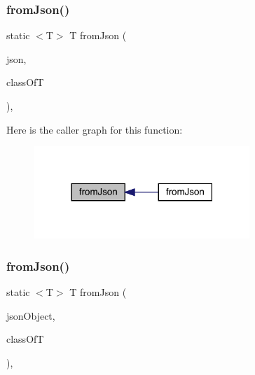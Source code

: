 \subsubsection{\texorpdfstring{from\+Json()}{fromJson()}\hspace{0.1cm}{\footnotesize\ttfamily [1/3]}}
{\footnotesize\ttfamily static $<$T$>$ T from\+Json (\begin{DoxyParamCaption}\item[{@Non\+Null String}]{json,  }\item[{Class$<$ T $>$}]{class\+OfT }\end{DoxyParamCaption})\hspace{0.3cm}{\ttfamily [static]}, {\ttfamily [inherited]}}

Here is the caller graph for this function\+:
\nopagebreak
\begin{figure}[H]
\begin{center}
\leavevmode
\includegraphics[width=230pt]{classcom_1_1toast_1_1android_1_1gamebase_1_1base_1_1_value_object_ae6655c88c20a9a8406dc11b46250ac7b_icgraph}
\end{center}
\end{figure}
\mbox{\label{classcom_1_1toast_1_1android_1_1gamebase_1_1base_1_1_value_object_ab83c4196ee2e3f11553bbe0f04dc2101}} 
\subsubsection{\texorpdfstring{from\+Json()}{fromJson()}\hspace{0.1cm}{\footnotesize\ttfamily [2/3]}}
{\footnotesize\ttfamily static $<$T$>$ T from\+Json (\begin{DoxyParamCaption}\item[{@Non\+Null J\+S\+O\+N\+Object}]{json\+Object,  }\item[{Class$<$ T $>$}]{class\+OfT }\end{DoxyParamCaption})\hspace{0.3cm}{\ttfamily [static]}, {\ttfamily [inherited]}}

